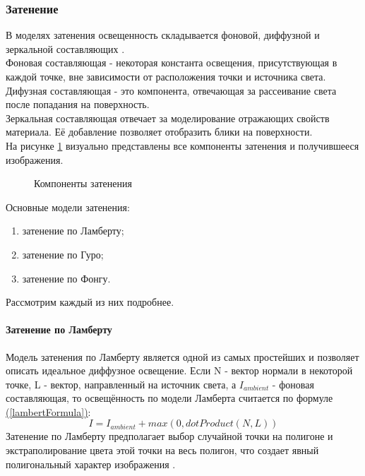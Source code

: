 \documentclass{article}
\begin{document}
	\subsubsection{Затенение}
	\indent  В моделях затенения освещенность складывается фоновой, диффузной и зеркальной составляющих \cite{shadowingPart}.
	\\ \indent Фоновая составляющая - некоторая константа освещения, присутствующая в каждой точке, вне зависимости от расположения точки и источника света.
	\\ \indent Дифузная составляющая - это компонента, отвечающая за рассеивание света после попадания на поверхность.
	\\ \indent Зеркальная составляющая отвечает за моделирование отражающих свойств материала. Её добавление позволяет отобразить блики на поверхности.
	\\ \indent На рисунке \hyperref[shadowDemonstration]{\ref{shadowDemonstration}} визуально представлены все компоненты затенения и получившееся изображения.
	\begin{figure}[H]
		 	\caption{Компоненты затенения}
		 	\label{shadowDemonstration}
	 	\end{figure}
	\indent Основные модели затенения:
	\begin{enumerate}
		\item затенение по Ламберту;
		\item затенение по Гуро;
		\item затенение по Фонгу.
	\end{enumerate}
	Рассмотрим каждый из них подробнее.
	\paragraph{Затенение по Ламберту}
	\indent Модель затенения по Ламберту является одной из самых простейших и позволяет описать идеальное диффузное освещение. Если N - вектор нормали в некоторой точке, L - вектор, направленный на источник света, а $I_{ambient}$ - фоновая составляющая, то освещённость по модели Ламберта считается по формуле \hyperref[lambertFormula]{(\ref{lambertFormula})}:
	\begin{equation}\label{lambertFormula}
			 I = I_{ambient} + max(0, dotProduct(N, L))
           \end{equation}
	Затенение по Ламберту предполагает выбор случайной точки на полигоне и экстраполирование цвета этой точки на весь полигон, что создает явный полигональный характер изображения \cite{shadowingLambert}.
\end{document}
